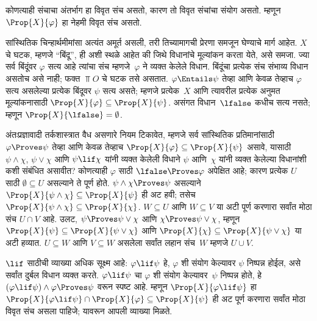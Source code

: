 कोणत्याही संचाचा अंतर्भाग हा विवृत संच असतो,
कारण तो विवृत संचांचा संयोग असतो. म्हणून
$\Prop{X}{\varphi}$ हा नेहमी विवृत संच असतो.

सांस्थितिक चिन्हार्थमीमांसा अत्यंत अमूर्त
असली, तरी तिच्यामागची प्रेरणा समजून घेण्याचे
मार्ग आहेत. $X$ चे घटक, म्हणजे
“बिंदू”, ही अशी स्थळे आहेत की जिथे विधानांचे
मूल्यांकन करता येते, असे समजा. ज्या सर्व
बिंदूंवर $\varphi$ सत्य आहे त्यांचा संच म्हणजे~$\varphi$
ने व्यक्त केलेले विधान. बिंदूंचा प्रत्येक संच
संभाव्य विधान असतोच असे नाही; फक्त $\Top{O}$ चे
घटक तसे असतात. $\varphi \Entails \psi$
तेव्हा आणि केवळ तेव्हाच $\varphi$ सत्य असलेल्या
प्रत्येक बिंदूवर $\psi$ सत्य असते; म्हणजे
प्रत्येक~$X$ आणि त्यावरील प्रत्येक अनुमत मूल्यांकनासाठी $\Prop{X}{\varphi}
\subseteq \Prop{X}{\psi}$. असंगत विधान~$\lfalse$
कधीच सत्य नसते; म्हणून
$\Prop{X}{\lfalse} = \emptyset$.

अंतःप्रज्ञावादी तर्कशास्त्रात वैध असणारे
नियम टिकावेत, म्हणजे सर्व सांस्थितिक प्रतिमानांसाठी
$\varphi \Proves \psi$ तेव्हा आणि केवळ तेव्हाच
$\Prop{X}{\varphi} \subseteq \Prop{X}{\psi}$
असावे, यासाठी $\psi \land \chi$,
$\psi \lor \chi$ आणि $\psi \lif \chi$ यांनी
व्यक्त केलेली विधाने $\psi$ आणि~$\chi$
यांनी व्यक्त केलेल्या विधानांशी कशी संबंधित
असावीत? कोणत्याही $\varphi$ साठी
$\lfalse \Proves \varphi$ अपेक्षित आहे; कारण
प्रत्येक $U$ साठी $\emptyset
\subseteq U$ असल्याने ते पूर्ण होते.
$\psi \land \chi \Proves \psi$ असल्याने
$\Prop{X}{\psi \land \chi} \subseteq \Prop{X}{\psi}$
ही अट हवी; तसेच
$\Prop{X}{\psi \land \chi} \subseteq \Prop{X}{\chi}$.
$W \subseteq U$ आणि $W \subseteq V$
या अटी पूर्ण करणारा सर्वांत मोठा संच
$U \cap V$ आहे. उलट,
$\psi \Proves \psi \lor \chi$ आणि
$\chi \Proves \psi \lor \chi$, म्हणून
$\Prop{X}{\psi} \subseteq \Prop{X}{\psi \lor \chi}$
आणि $\Prop{X}{\chi} \subseteq \Prop{X}{\psi \lor \chi}$
या अटी हव्यात. $U \subseteq W$ आणि
$V \subseteq W$ असलेला सर्वांत लहान
संच~$W$ म्हणजे $U \cup V$.

$\lif$ साठीची व्याख्या अधिक सूक्ष्म आहे:
$\varphi \lif \psi$ हे, $\varphi$ शी संयोग केल्यावर
$\psi$ निष्पन्न होईल, असे सर्वांत दुर्बल
विधान व्यक्त करते. $\varphi \lif \psi$ चा
$\varphi$ शी संयोग केल्यावर~$\psi$ निष्पन्न होते,
हे $(\varphi \lif \psi)
\land \varphi \Proves \psi $ वरून स्पष्ट आहे.
म्हणून $\Prop{X}{\varphi \lif \psi}$ हा
$\Prop{X}{\varphi \lif \psi} \cap \Prop{X}{\varphi}
\subseteq \Prop{X}{\psi}$ ही अट पूर्ण करणारा
सर्वांत मोठा विवृत संच असला पाहिजे;
यावरून आपली व्याख्या मिळते.



